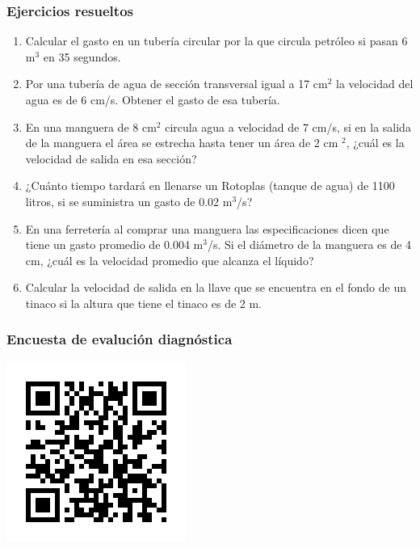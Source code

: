 \documentclass[handout]{beamer}
\begin{document}
\begin{frame}[allowframebreaks,t]
\frametitle{Ejercicios resueltos}
\begin{enumerate}
\item Calcular el gasto en un tubería circular por la que circula
  petróleo si pasan 6 m$^3$ en 35 segundos.
\item Por una tubería de agua de sección transversal igual a 17 cm$^2$ la velocidad del
  agua es de 6 cm/s. Obtener el gasto de esa tubería.
\item En una manguera de 8 cm$^2$ circula agua a velocidad de 7 cm/s, si en la salida de
  la manguera el área se estrecha hasta tener un área de 2 cm $^2$, ¿cuál es la velocidad
  de salida en esa sección?
\item ¿Cuánto tiempo tardará en llenarse un Rotoplas (tanque de agua) de 1100 litros, si
 se suministra un gasto de 0.02 m$^3$/s?
\item En una ferretería al comprar una manguera las especificaciones dicen que tiene un
  gasto promedio de 0.004 m$^3$/s. Si el diámetro de la manguera es de 4 cm, ¿cuál es la
  velocidad promedio que alcanza el líquido?
\item Calcular la velocidad de salida en la llave que se encuentra en el fondo de un
  tinaco si la altura que tiene el tinaco es de 2 m.
\end{enumerate}
\end{frame}


\begin{frame}
  \frametitle{Encuesta de evalución diagnóstica}
  \begin{center}
    \includegraphics[scale=0.95]{qrevaluacion}
  \end{center}
\end{frame}



\end{document}
